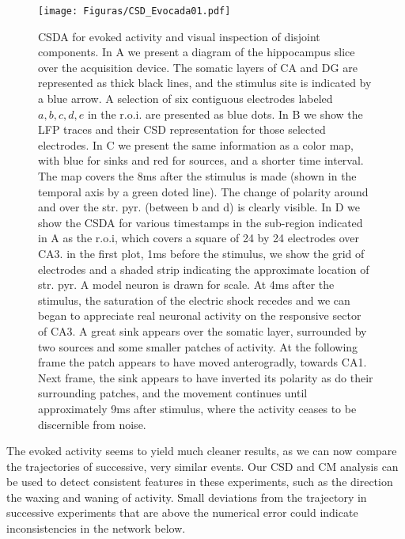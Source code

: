 \documentclass{article}
\begin{document}
\begin{figure}[h]
  \texttt{[image: Figuras/CSD\_Evocada01.pdf]}
  \caption{ CSDA for evoked activity and visual inspection of disjoint
    components. In A we present a diagram of the hippocampus slice over
    the acquisition device. The somatic layers of CA and DG are represented as
    thick black lines, and the stimulus site is indicated by a blue arrow. A selection
    of six contiguous electrodes labeled $a,b,c,d,e$ in the r.o.i. are presented as blue
    dots. In B we show the LFP traces and their CSD representation for those
    selected electrodes. In C we present the same information as a color map,
    with blue for sinks and red for sources, and a shorter time interval. The
    map covers the 8ms after the stimulus is made (shown in the temporal axis by a
    green doted line). The change of polarity around and over the str. pyr. (between b and
    d) is clearly visible. In D we show the CSDA for various timestamps in the sub-region
    indicated in A as the r.o.i, which covers a square of 24 by 24 electrodes over CA3.
    in the first plot, 1ms before the stimulus, we show the grid of electrodes and a
    shaded strip indicating the approximate location of str. pyr. A model neuron is
    drawn for scale. At 4ms after the stimulus, the saturation of the electric shock
    recedes and we can began to appreciate real neuronal activity on the responsive
    sector of CA3. A great sink appears over the somatic layer, surrounded by two
    sources and some smaller patches of activity. At the following frame the patch
    appears to have moved anterogradly, towards CA1. Next frame, the sink appears
    to have inverted its polarity as do their surrounding patches, and the movement
    continues until approximately 9ms after stimulus, where the activity ceases to be
    discernible from noise.}
  \label{CSD_Evocada01}
\end{figure}



The evoked activity seems to yield much cleaner results, as we can now compare the trajectories of successive, very similar events. Our CSD and CM analysis can be used to detect consistent features in these experiments, such as the direction the waxing and waning of activity. Small deviations from the trajectory in successive experiments that are above the numerical error could indicate inconsistencies in the network below. 
\end{document}
